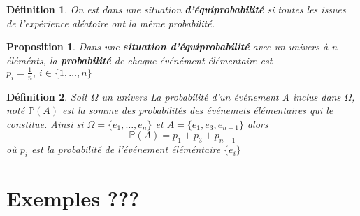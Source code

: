 \documentclass[a4paper]{report}
\theoremstyle{break}
\newtheorem{mydef}{Définition}[chapter]
\newtheorem{prop}{Proposition}[chapter]
\begin{document}
\begin{mydef}
  On est dans une situation \textbf{d'équiprobabilité} si toutes les issues de
  l'expérience aléatoire ont la même probabilité. 
\end{mydef}

\begin{prop}
  Dans une \textbf{situation d'équiprobabilité} avec un univers à n éléménts,
  la  \textbf{probabilité} de chaque événément élémentaire est $p_i = \frac{1}{n},~ i \in \{1,\dots,n\}$
\end{prop}

\begin{mydef}
  Soit $\Omega$ un univers La probabilité d'un événement A inclus dans $\Omega$,
  noté $\mathbb{P}(A)$ est la somme des probabilités des événemets élémentaires
  qui le constitue. Ainsi si $\Omega = \{ e_1, \dots, e_n\}$ et $A = \{e_1, e_3,
  e_{n-1}\}$ alors
  \[
    \mathbb{P}(A) = p_1 + p_3 + p_{n-1}
  \]
  où $p_i$ est la probabilité de l'événement éléméntaire $\{e_i\}$
   
\end{mydef}
\section{Exemples ???}
\end{document}
